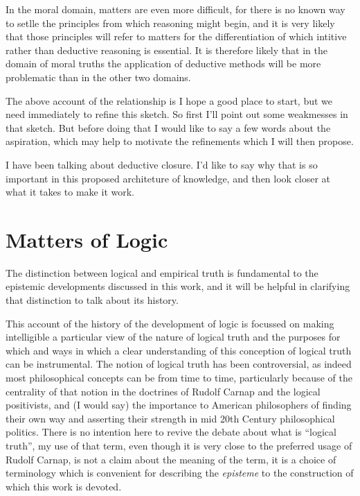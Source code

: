 \documentclass[10pt,titlepage]{article}
\begin{document}
In the moral domain, matters are even more difficult, for there is no known way to setlle the principles from which reasoning might begin, and it is very likely that those principles will refer to matters for the differentiation of which intitive rather than deductive reasoning is essential.
It is therefore likely that in the domain of moral truths the application of deductive methods will be more problematic than in the other two domains.

The above account of the relationship is I hope a good place to start, but we need immediately to refine this sketch.
So first I'll point out some weakmesses in that sketch.
But before doing that I would like to say a few words about the aspiration, which may help to motivate the refinements which I will then propose.

I have been talking about deductive closure.
I'd like to say why that is so important in this proposed architeture of knowledge, and then look closer at what it takes to make it work.

\section{Matters of Logic}

The distinction between logical and empirical truth is fundamental to the epistemic developments discussed in this work, and it will be helpful in clarifying that distinction to talk about its history.

This account of the history of the development of logic is focussed on making intelligible a particular view of the nature of logical truth and the purposes for which and ways in which a clear understanding of this conception of logical truth can be instrumental.
The notion of logical truth has been controversial, as indeed most philosophical concepts can be from time to time, particularly because of the centrality of that notion in the doctrines of Rudolf Carnap and the logical positivists, and (I would say) the importance to American philosophers of finding their own way and asserting their strength in mid 20th Century philosophical politics.
There is no intention here to revive the debate about what is ``logical truth'', my use of that term, even though it is very close to the preferred usage of Rudolf Carnap, is not a claim about the meaning of the term, it is a choice of terminology which is convenient for describing the \emph{episteme} to the construction of which this work is devoted.
\end{document}
